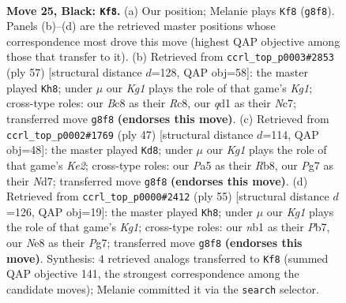 \documentclass[11pt]{article}
\begin{document}
\clearpage

\begin{figure}[p]\centering
\begin{subfigure}{0.46\textwidth}\centering
\resizebox{\linewidth}{!}{%
\newchessgame
\chessboard[
  setfen={rnb1n1k1/1p4pp/1q5B/p2B1p1P/P1PN3b/6P1/8/RN1Q2K1 b - - 1 25},
  showmover=false,
  pgfstyle=straightmove, color=movearrow, markmove={g8-f8}
]}
\caption{}
\end{subfigure}\hfill
\begin{subfigure}{0.46\textwidth}\centering
\resizebox{\linewidth}{!}{%
\newchessgame
\chessboard[
  setfen={2r3k1/2n2ppp/4pN1q/8/Pp2P1Q1/1n4P1/1B3b1P/3R1B1K b - - 7 29},
  showmover=false,
  pgfstyle=straightmove, color=movearrow, markmove={g8-h8}
]}
\caption{}
\end{subfigure}
\\[4pt]
\begin{subfigure}{0.46\textwidth}\centering
\resizebox{\linewidth}{!}{%
\newchessgame
\chessboard[
  setfen={1r5r/3nkppp/p3p3/5Nq1/Pp6/1b1B1Q2/1P3PPK/2R1R3 b - - 3 24},
  showmover=false,
  pgfstyle=straightmove, color=movearrow, markmove={e7-d8}
]}
\caption{}
\end{subfigure}\hfill
\begin{subfigure}{0.46\textwidth}\centering
\resizebox{\linewidth}{!}{%
\newchessgame
\chessboard[
  setfen={4r1k1/1p4pp/p3npb1/3BP3/1P5P/P1q2N2/4Q1P1/5R1K b - - 0 28},
  showmover=false,
  pgfstyle=straightmove, color=movearrow, markmove={g8-h8}
]}
\caption{}
\end{subfigure}
\caption{\textbf{Move 25, Black: \texttt{Kf8}.} (a) Our position; Melanie plays \texttt{Kf8} (\texttt{g8f8}). Panels (b)--(d) are the retrieved master positions whose correspondence most drove this move (highest QAP objective among those that transfer to it). (b) Retrieved from \texttt{ccrl\_top\_p0003\#2853} (ply 57) [structural distance $d$=128, QAP obj=58]: the master played \texttt{Kh8}; under $\mu$ our \emph{Kg1} plays the role of that game's \emph{Kg1}; cross-type roles: our \emph{B}c8 as their \emph{R}c8, our \emph{q}d1 as their \emph{N}c7; transferred move \texttt{g8f8} \textbf{(endorses this move)}. (c) Retrieved from \texttt{ccrl\_top\_p0002\#1769} (ply 47) [structural distance $d$=114, QAP obj=48]: the master played \texttt{Kd8}; under $\mu$ our \emph{Kg1} plays the role of that game's \emph{Ke2}; cross-type roles: our \emph{P}a5 as their \emph{R}b8, our \emph{P}g7 as their \emph{N}d7; transferred move \texttt{g8f8} \textbf{(endorses this move)}. (d) Retrieved from \texttt{ccrl\_top\_p0000\#2412} (ply 55) [structural distance $d$=126, QAP obj=19]: the master played \texttt{Kh8}; under $\mu$ our \emph{Kg1} plays the role of that game's \emph{Kg1}; cross-type roles: our \emph{n}b1 as their \emph{P}b7, our \emph{N}e8 as their \emph{P}g7; transferred move \texttt{g8f8} \textbf{(endorses this move)}. Synthesis: 4 retrieved analogs transferred to \texttt{Kf8} (summed QAP objective 141, the strongest correspondence among the candidate moves); Melanie committed it via the \texttt{search} selector.}
\label{fig:thought-m49}
\end{figure}
\end{document}
